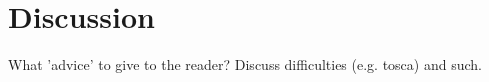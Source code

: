 \section{Discussion}\label{disc}
What 'advice' to give to the reader? Discuss difficulties (e.g. tosca) and such.